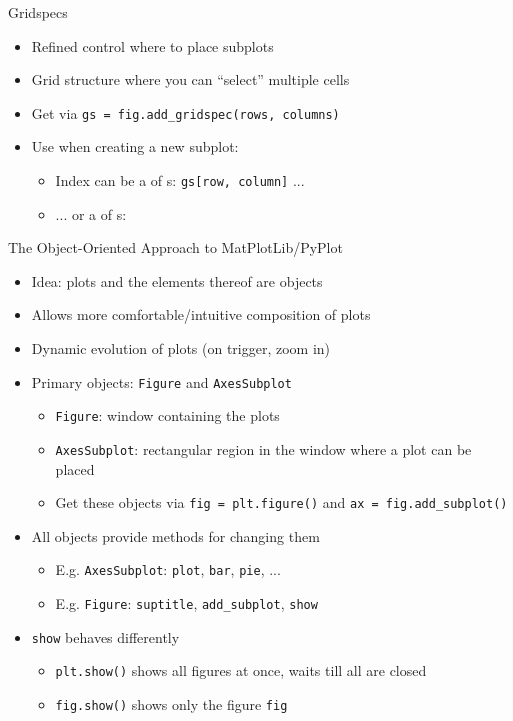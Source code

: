 
\begin{frame}[fragile]{Gridspecs}
%
\begin{itemize}
\item Refined control where to place subplots
\item Grid structure where you can \enquote{select} multiple cells
\item Get via \texttt{gs = fig.add\_gridspec(rows, columns)}
\item Use when creating a new subplot: 
	\begin{itemize}
	\item Index can be a  of s: \texttt{gs[row, column]} ...
	\item ... or a  of s:
	\end{itemize}
\end{itemize}
%
\end{frame}


\begin{frame}[fragile]{The Object-Oriented Approach to MatPlotLib/PyPlot}
%
\begin{itemize}
\item Idea: plots and the elements thereof are objects
\item Allows more comfortable/intuitive composition of plots
\item Dynamic evolution of plots (\eg on trigger, zoom in)
\item Primary objects: \texttt{Figure} and \texttt{AxesSubplot}
	\begin{itemize}
	\item \texttt{Figure}: window containing the plots
	\item \texttt{AxesSubplot}: rectangular region in the window where a plot can be placed
	\item Get these objects via \texttt{fig = plt.figure()} and \texttt{ax = fig.add\_subplot()}
	\end{itemize}
\item All objects provide methods for changing them
	\begin{itemize}
	\item E.\;g. \texttt{AxesSubplot}: \texttt{plot}, \texttt{bar}, \texttt{pie}, ...
	\item E.\;g. \texttt{Figure}: \texttt{suptitle}, \texttt{add\_subplot}, \texttt{show}
	\end{itemize}
\item \texttt{show} behaves differently
	\begin{itemize}
	\item \texttt{plt.show()} shows all figures at once, waits till all are closed
	\item \texttt{fig.show()} shows only the figure \texttt{fig}
	\end{itemize}
\end{itemize}
%
\end{frame}

